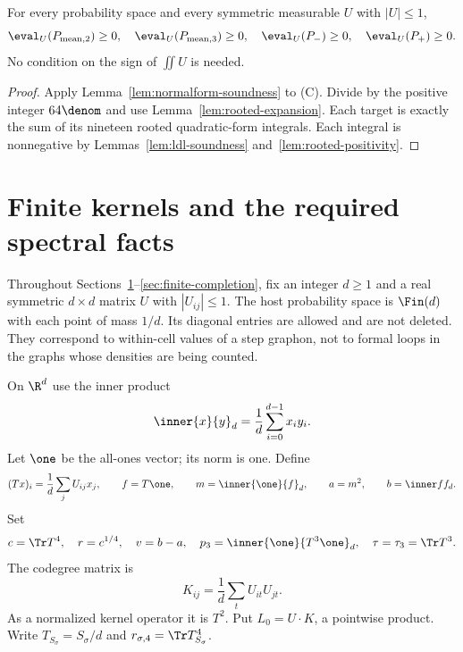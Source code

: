 \begin{theorem}
\label{thm:certificate-inequalities}
\proved For every probability space and every symmetric measurable $U$ with $|U|\le1$,
\[
 \eval_U(P_{\mathrm{mean},2})\ge0,\quad
 \eval_U(P_{\mathrm{mean},3})\ge0,\quad
 \eval_U(P_-)\ge0,\quad
 \eval_U(P_+)\ge0.
\]
No condition on the sign of $\iint U$ is needed.
\end{theorem}
\begin{proof}
Apply Lemma~\ref{lem:normalform-soundness} to (C).  Divide by the positive integer
$64\denom$ and use Lemma~\ref{lem:rooted-expansion}.  Each target is exactly the sum of its
nineteen rooted quadratic-form integrals.  Each integral is nonnegative by
Lemmas~\ref{lem:ldl-soundness} and~\ref{lem:rooted-positivity}.
\end{proof}

\section{Finite kernels and the required spectral facts}
\label{sec:finite-spectral}

Throughout Sections~\ref{sec:finite-spectral}--\ref{sec:finite-completion}, fix an integer
$d\ge1$ and a real symmetric $d\times d$ matrix $U$ with $|U_{ij}|\le1$.  The host probability
space is $\Fin(d)$ with each point of mass $1/d$.  Its diagonal entries are allowed and are
not deleted.  They correspond to within-cell values of a step graphon, not to formal loops
in the graphs whose densities are being counted.

\begin{definition}
\label{def:finite-scalars}
On $\R^d$ use the inner product
\[
 \inner{x}{y}_d=\frac1d\sum_{i=0}^{d-1}x_i y_i.
\]
Let $\one$ be the all-ones vector; its norm is one.  Define
\[
 (Tx)_i=\frac1d\sum_jU_{ij}x_j,\qquad
 f=T\one,\qquad m=\inner{\one}{f}_d,\qquad a=m^2,\qquad b=\inner f f_d.
\]
Set
\[
 c=\Tr T^4,\quad r=c^{1/4},\quad v=b-a,\quad
 p_3=\inner{\one}{T^3\one}_d,\quad\tau=\tau_3=\Tr T^3.
\]
The codegree matrix is
\[
 K_{ij}=\frac1d\sum_t U_{it}U_{jt}.
\]
As a normalized kernel operator it is $T^2$.  Put $L_0=U\cdot K$, a pointwise product.
Write $T_{S_\sigma}=S_\sigma/d$ and $r_{\sigma,4}=\Tr T_{S_\sigma}^4$.
\end{definition}

